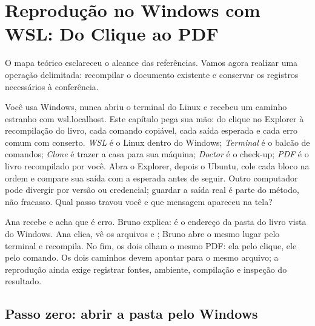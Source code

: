 \chapter{Reprodução no Windows com WSL: Do Clique ao PDF}

O mapa teórico esclareceu o alcance das referências. Vamos agora realizar uma operação delimitada: recompilar o documento existente e conservar os registros necessários à conferência.


\roteirodidatico
{Você usa Windows, nunca abriu o terminal do Linux e recebeu um caminho estranho com wsl.localhost. Este capítulo pega sua mão: do clique no Explorer à recompilação do livro, cada comando copiável, cada saída esperada e cada erro comum com conserto.}
{\emph{WSL} é o Linux dentro do Windows; \emph{Terminal} é o balcão de comandos; \emph{Clone} é trazer a casa para sua máquina; \emph{Doctor} é o check-up; \emph{PDF} é o livro recompilado por você.}
{Abra o Explorer, depois o Ubuntu, cole cada bloco na ordem e compare sua saída com a esperada antes de seguir.}
{Outro computador pode divergir por versão ou credencial; guardar a saída real é parte do método, não fracasso.}
{Qual passo travou você e que mensagem apareceu na tela?}

{Ana recebe  e acha que é erro. Bruno explica: é o endereço da pasta do livro vista do Windows. Ana clica, vê os arquivos  e ; Bruno abre o mesmo lugar pelo terminal e recompila. No fim, os dois olham o mesmo PDF: ela pelo clique, ele pelo comando. Os dois caminhos devem apontar para o mesmo arquivo; a reprodução ainda exige registrar fontes, ambiente, compilação e inspeção do resultado.}

\section{Passo zero: abrir a pasta pelo Windows}

